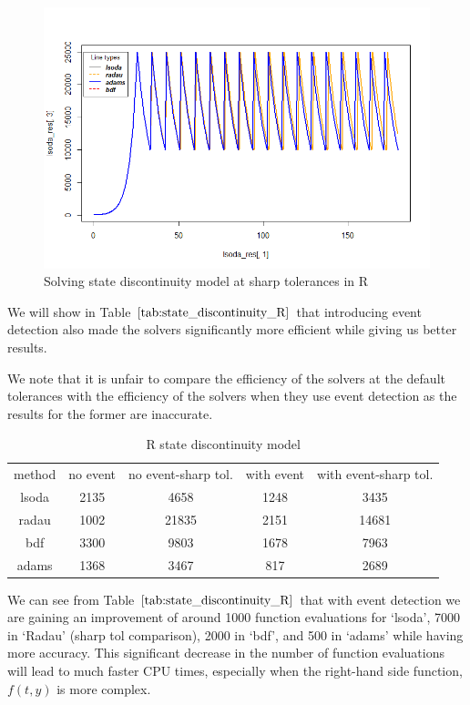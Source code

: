 \begin{figure}[H]
\centering
\includegraphics[width=0.7\linewidth]{./figures/solve_state_discontinuity_sharp_R}
\caption{Solving state discontinuity model at sharp tolerances in R}
\label{fig:solve_state_discontinuity_sharp_R}
\end{figure}

We will show in Table $\ref{tab:state_discontinuity_R}$ that introducing event detection also made the solvers significantly more efficient while giving us better results.

We note that it is unfair to compare the efficiency of the solvers at the default tolerances with the efficiency of the solvers when they use event detection as the results for the former are inaccurate.

\begin{table}[h]
\caption {R state discontinuity model} 
\label{tab:state_discontinuity_R}
\begin{center}
\begin{tabular}{ c c c c c } 
method & no event & no event-sharp tol. & with event & with event-sharp tol.\\ 
lsoda & 2135 & 4658 & 1248 & 3435 \\
radau & 1002 & 21835 & 2151 & 14681\\
bdf & 3300 & 9803 & 1678 & 7963\\
adams & 1368 & 3467 & 817 & 2689\\
\end{tabular}
\end{center}
\end{table}

We can see from Table $\ref{tab:state_discontinuity_R}$ that with event detection we are gaining an improvement of around 1000 function evaluations for `lsoda', 7000 in `Radau' (sharp tol comparison), 2000 in `bdf', and 500 in `adams' while having more accuracy. This significant decrease in the number of function evaluations will lead to much faster CPU times, especially when the right-hand side function, $f(t, y)$ is more complex.

